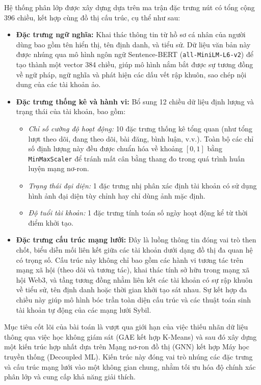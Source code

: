 Hệ thống phân lớp được xây dựng dựa trên ma trận đặc trưng nút có tổng cộng 396 chiều, kết hợp cùng đồ thị cấu trúc, cụ thể như sau:
\vspace{-0.1cm}
\begin{itemize}[label={--}, itemsep=1pt]
    \item \textbf{Đặc trưng ngữ nghĩa:} Khai thác thông tin từ hồ sơ cá nhân của người dùng bao gồm tên hiển thị, tên định danh, và tiểu sử. Dữ liệu văn bản này được nhúng qua mô hình ngôn ngữ Sentence-BERT (\texttt{all-MiniLM-L6-v2}) để tạo thành một vector 384 chiều, giúp mô hình nắm bắt được sự tương đồng về ngữ pháp, ngữ nghĩa và phát hiện các dấu vết rập khuôn, sao chép nội dung của các tài khoản ảo.
    
    \item \textbf{Đặc trưng thống kê và hành vi:} Bổ sung 12 chiều dữ liệu định lượng và trạng thái của tài khoản, bao gồm:
    \begin{itemize}[label={+}, itemsep=1pt]
        \item \textit{Chỉ số cường độ hoạt động:} 10 đặc trưng thống kê tổng quan (như tổng lượt theo dõi, đang theo dõi, bài đăng, bình luận, v.v.). Toàn bộ các chỉ số định lượng này đều được chuẩn hóa về khoảng $[0, 1]$ bằng \texttt{MinMaxScaler} để tránh mất cân bằng thang đo trong quá trình huấn luyện mạng nơ-ron.
        \item \textit{Trạng thái đại diện:} 1 đặc trưng nhị phân xác định tài khoản có sử dụng hình ảnh đại diện tùy chỉnh hay chỉ dùng ảnh mặc định.
        \item \textit{Độ tuổi tài khoản:} 1 đặc trưng tính toán số ngày hoạt động kể từ thời điểm khởi tạo.
    \end{itemize}
    
    \item \textbf{Đặc trưng cấu trúc mạng lưới:} Đây là luồng thông tin đóng vai trò then chốt, biểu diễn mối liên kết giữa các tài khoản dưới dạng đồ thị đa quan hệ có trọng số. Cấu trúc này không chỉ bao gồm các hành vi tương tác trên mạng xã hội (theo dõi và tương tác), khai thác tính sở hữu trong mạng xã hội Web3, và tầng tương đồng nhằm liên kết các tài khoản có sự rập khuôn về tiểu sử, tên định danh hoặc thời gian khởi tạo sát nhau. Sự kết hợp đa chiều này giúp mô hình bóc trần toàn diện cấu trúc và các thuật toán sinh tài khoản tự động của các mạng lưới Sybil.
\end{itemize}

Mục tiêu cốt lõi của bài toán là vượt qua giới hạn của việc thiếu nhãn dữ liệu thông qua việc học không giám sát (GAE kết hợp K-Means) và sau đó xây dựng một kiến trúc hợp nhất dựa trên Mạng nơ-ron đồ thị (GNN) kết hợp Máy học truyền thống (Decoupled ML). Kiến trúc này đóng vai trò nhúng các đặc trưng và cấu trúc mạng lưới vào một không gian chung, nhằm tối ưu hóa độ chính xác phân lớp và cung cấp khả năng giải thích.

